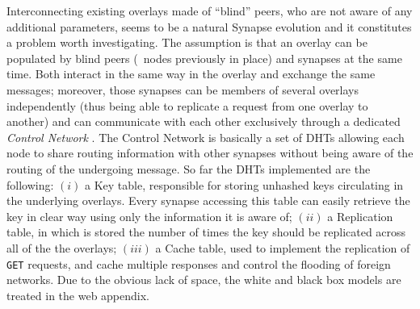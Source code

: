 %
% 
Interconnecting existing overlays made of ``blind'' peers, who are not
aware of any additional parameters, seems to be a natural Synapse
evolution and it constitutes a problem worth investigating.  The
assumption is that an overlay can be populated by blind peers (\eg\
nodes previously in place) and synapses at the same time.  Both
interact in the same way in the overlay and exchange the same
messages; moreover, those synapses can be members of several overlays
independently (thus being able to replicate a request from one overlay
to another) and can communicate with each other exclusively through a
dedicated \emph{Control Network} . The Control Network is basically a
set of DHTs allowing each node to share routing information with other
synapses without being aware of the routing of the undergoing
message. So far the DHTs implemented are the following: $(i)$ a Key
table, responsible for storing unhashed keys circulating in the
underlying overlays. Every synapse accessing this table can easily
retrieve the key in clear way using only the information it is aware
of; $(ii)$ a Replication table, in which is stored the number of times
the key should be replicated across all of the the overlays; $(iii)$ a
Cache table, used to implement the replication of {\tt GET} requests,
and cache multiple responses and control the flooding of foreign
networks. Due to the obvious lack of space, the white and black box
models are treated in the web appendix.

